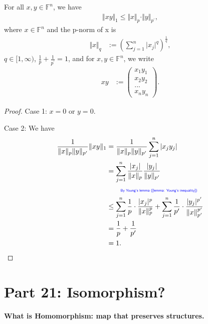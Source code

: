 \documentclass[../../note.tex]{subfiles}
\begin{document}
\begin{theorem}
    \label{lemma: Holder's inequality}
    For all $x,y \in \mathbb{F}^n$, we have 
    \begin{align}
        \Vert xy \Vert_1 \leq \Vert x \Vert_p \cdot \Vert y \Vert_{p^\prime},
    \end{align}
    where $x \in \mathbb{F}^n$ and the p-norm of x is
    \begin{align}
        \Vert x \Vert_q
        &:= \left(\sum_{j=1}^{n} \vert x_j \vert^q \right)^{\frac{1}{q}},
    \end{align}
    $q \in [1,\infty)$, $\frac{1}{p} + \frac{1}{p^\prime} = 1$, and for $x,y \in \mathbb{F}^n$, we write
    \begin{align}
        xy
        &:= \left(\begin{matrix}
            x_1 y_1 \\
            x_2 y_2 \\
            ... \\
            x_n y_n
        \end{matrix}\right).
    \end{align}
\end{theorem}
\begin{proof}
    Case 1: $x = 0$ or $y = 0$.

    Case 2: We have
    \begin{align}
        \frac{1}{\Vert x \Vert_p \Vert y \Vert_{p^\prime}} \Vert xy \Vert_1 
        &= \frac{1}{\Vert x \Vert_p \Vert y \Vert_{p^\prime}} \sum_{j=1}^n \vert x_j y_j \vert \\
        &= \sum_{j=1}^n \frac{\vert x_j \vert}{\Vert x \Vert_p} \frac{\vert y_j \vert}{\Vert y \Vert_{p^\prime}} \\
        &\qquad\text{\color{blue}{\tiny\sffamily By Young's lemma (\ref{lemma: Young's inequality})}} \nonumber \\
        &\leq \sum_{j=1}^n \frac{1}{p} \cdot \frac{\vert x_j \vert^p}{\Vert x \Vert^p_p} +  \sum_{j=1}^n \frac{1}{p^\prime} \cdot \frac{\vert y_j \vert^{p^\prime}}{\Vert x \Vert^{p^\prime}_{p^\prime}} \\
        &=\frac{1}{p} + \frac{1}{p^\prime} \\
        &= 1.
    \end{align}
\end{proof}

\section{Part 21: Isomorphism?}
\begin{definition}[Homomorphism]
    \textbf{What is Homomorphism: map that preserves structures.}
\end{definition}
\end{document}
